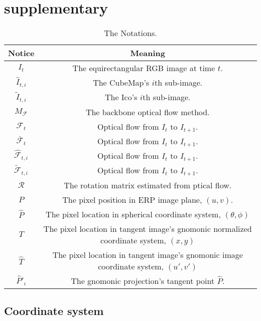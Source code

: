 \section{supplementary}


\begin{table}[h!]
	\begin{center}
		\begin{tabular}{ c | c } 
			\hline
			Notice & Meaning  \\ 
			\hline\hline
			$I_t$          & The equirectangular RGB image at time $t$. \\
			\hline
			$\hat{I}_{t,i}$ & The CubeMap's $i$th sub-image.\\
			\hline
			$\tilde{I}_{t,i}$ & The Ico's $i$th sub-image.\\
			\hline
			$M_{\mathcal{F}}$ & The backbone optical flow method. \\
			\hline
			$\mathcal{F}_t$ & Optical flow from $I_t$ to $I_{t+1}$. \\
			\hline
			$\bar{\mathcal{F}}_t$ & Optical flow from $I_t$ to $I_{t+1}$. \\
			\hline
			$\hat{\mathcal{F}}_{t,i}$ & Optical flow from $I_t$ to $I_{t+1}$. \\
			\hline
			$\tilde{\mathcal{F}}_{t,i}$ & Optical flow from $I_t$ to $I_{t+1}$. \\
			\hline
			$\mathcal{R}$   & The rotation matrix estimated from ptical flow. \\
			\hline
			$P$            & The pixel position in ERP image plane, $(u,v)$.   \\
			\hline
			$\hat{P}$      & The pixel location in spherical coordinate system, $(\theta, \phi)$ \\
			\hline
			$T$            & The pixel location in tangent image's gnomonic normalized coordinate system, $(x,y)$ \\
			\hline
			$\hat{T}$      & The pixel location in tangent image's gnomonic image coordinate system, $({u}',{v}')$ \\
			\hline
			$\hat{P}'_i$ & The gnomonic projection's tangent point $\hat{P}$. \\
			\hline
		\end{tabular}
	\end{center}
	\caption{The Notations.}
	\label{tab:approach:notation}
\end{table}

\subsection{Coordinate system}


